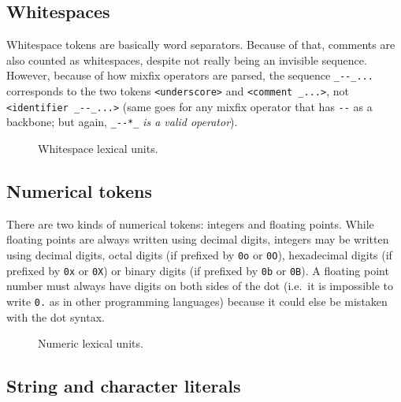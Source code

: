 \subsection{Whitespaces}\label{subsec:zilch-grammar-lexical-whitespaces}

Whitespace tokens are basically word separators.
Because of that, comments are also counted as whitespaces, despite not really being an invisible sequence.
However, because of how mixfix operators are parsed, the sequence \verb|_--_...| corresponds to the two tokens \verb|<underscore>| and \verb|<comment _...>|, not \verb|<identifier _--_...>| (same goes for any mixfix operator that has \verb|--| as a backbone; but again, \verb|_--*_| \textit{is a valid operator}).

\begin{figure}[H]
  \centering


  \caption{Whitespace lexical units.}
  \label{fig:zilch-grammar-lexical-whitespaces-grammar}
\end{figure}

\subsection{Numerical tokens}\label{subsec:zilch-grammar-lexical-numbers}

There are two kinds of numerical tokens: integers and floating points.
While floating points are always written using decimal digits, integers may be written using decimal digits, octal digits (if prefixed by \verb|0o| or \verb|0O|), hexadecimal digits (if prefixed by \verb|0x| or \verb|0X|) or binary digits (if prefixed by \verb|0b| or \verb|0B|).
A floating point number must always have digits on both sides of the dot (i.e.\ it is impossible to write \verb|0.| as in other programming languages) because it could else be mistaken with the dot syntax.

\begin{figure}[H]
  \centering


  \caption{Numeric lexical units.}
  \label{fig:zilch-grammar-lexical-numbers-grammar}
\end{figure}

\subsection{String and character literals}\label{subsec:zilch-grammar-lexical-strings}


